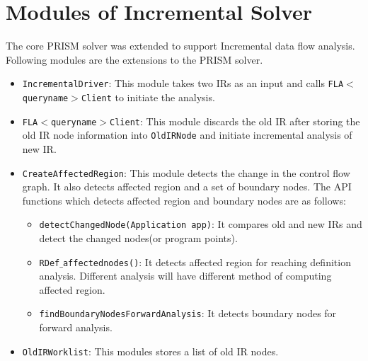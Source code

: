 \documentclass[11pt,a4paper,openright]{report}
\begin{document}
\section{Modules of Incremental Solver}
The core PRISM solver was extended to support Incremental data flow analysis. Following modules are the extensions to the PRISM solver.
\begin{itemize}
 \item \texttt{IncrementalDriver}: This module takes two IRs as an input and calls \texttt{FLA$<$queryname$>$Client} to initiate the analysis.
 \item \texttt{FLA$<$queryname$>$Client}: This module discards the old IR after storing the old IR node information into \texttt{OldIRNode}
 and initiate incremental analysis of new IR.
 \item \texttt{CreateAffectedRegion}: This module detects the change in the control flow graph. It also detects affected region and a set of boundary nodes.
 The API functions which detects affected region and boundary nodes are as follows:
 \begin{itemize}
  \item \texttt{detectChangedNode(Application app)}: It compares old and new IRs and detect the changed nodes(or program points).
  \item \texttt{RDef$\_$affectednodes()}: It detects affected region for reaching definition analysis. Different analysis will have different method of computing affected region. 
  \item \texttt{findBoundaryNodesForwardAnalysis}: It detects boundary nodes for forward analysis. 
   \end{itemize}
 \item \texttt{OldIRWorklist}: This modules stores a list of old IR nodes.
\end{itemize}

% 
\end{document}
